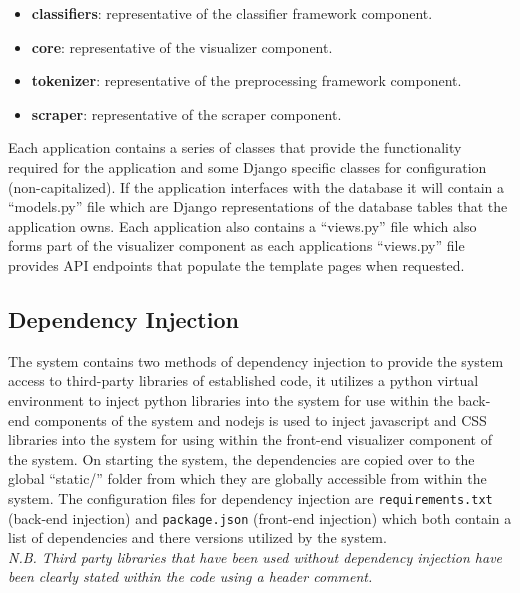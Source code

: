 \documentclass[11pt]{report}
\begin{document}
\begin{itemize}
\item \textbf{classifiers}: representative of the classifier framework component.
\item \textbf{core}: representative of the visualizer component.
\item \textbf{tokenizer}: representative of the preprocessing framework component.
\item \textbf{scraper}: representative of the scraper component.
\end {itemize}

Each application contains a series of classes that provide the functionality required for the application and some Django specific classes for configuration (non-capitalized). If the application interfaces with the database it will contain a ``models.py'' file which are Django representations of the database tables that the application owns. Each application also contains a ``views.py'' file which also forms part of the visualizer component as each applications ``views.py'' file provides API endpoints that populate the template pages when requested.

\subsection{Dependency Injection}
The system contains two methods of dependency injection to provide the system access to third-party libraries of established code, it utilizes a python virtual environment to inject python libraries into the system for use within the back-end components of the system and nodejs is used to inject javascript and CSS libraries into the system for using within the front-end visualizer component of the system. On starting the system, the dependencies are copied over to the global ``static/'' folder from which they are globally accessible from within the system. The configuration files for dependency injection are \texttt{requirements.txt} (back-end injection) and \texttt{package.json} (front-end injection) which both contain a list of dependencies and there versions utilized by the system.
\\

\textit{N.B. Third party libraries that have been used without dependency injection have been clearly stated within the code using a header comment.}
\end{document}
